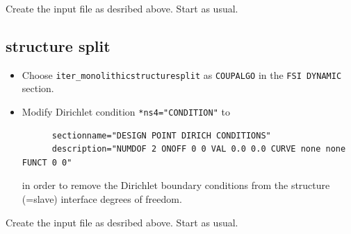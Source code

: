 Create the input file as desribed above. Start \baci{} as usual.

\subsection{structure split}

\begin{itemize}
  \item Choose \verb|iter_monolithicstructuresplit| as \verb|COUPALGO| in the
\verb|FSI DYNAMIC| section.
  \item Modify Dirichlet condition \verb|*ns4="CONDITION"| to 
  \begin{small}
    \begin{verbatim}
      sectionname="DESIGN POINT DIRICH CONDITIONS"
      description="NUMDOF 2 ONOFF 0 0 VAL 0.0 0.0 CURVE none none FUNCT 0 0"
    \end{verbatim}
  \end{small}
  in order to remove the Dirichlet boundary conditions from the structure
  (=slave) interface degrees of freedom.
\end{itemize}

Create the input file as desribed above. Start \baci{} as usual.
